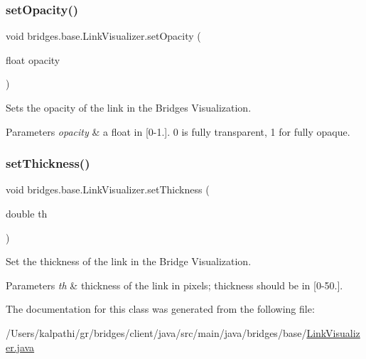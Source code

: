 \subsubsection{\texorpdfstring{set\+Opacity()}{setOpacity()}}
{\footnotesize\ttfamily void bridges.\+base.\+Link\+Visualizer.\+set\+Opacity (\begin{DoxyParamCaption}\item[{float}]{opacity }\end{DoxyParamCaption})}



Sets the opacity of the link in the Bridges Visualization. 


\begin{DoxyParams}{Parameters}
{\em opacity} & a float in \mbox{[}0-\/1.\mbox{]}. 0 is fully transparent, 1 for fully opaque. \\
\hline
\end{DoxyParams}
\mbox{\label{classbridges_1_1base_1_1_link_visualizer_a702e9ca345d1a4a035baf2041f275849}} 
\subsubsection{\texorpdfstring{set\+Thickness()}{setThickness()}}
{\footnotesize\ttfamily void bridges.\+base.\+Link\+Visualizer.\+set\+Thickness (\begin{DoxyParamCaption}\item[{double}]{th }\end{DoxyParamCaption})}



Set the thickness of the link in the Bridge Visualization. 


\begin{DoxyParams}{Parameters}
{\em th} & thickness of the link in pixels; thickness should be in \mbox{[}0-\/50.\mbox{]}. \\
\hline
\end{DoxyParams}


The documentation for this class was generated from the following file\+:\begin{DoxyCompactItemize}
\item 
/\+Users/kalpathi/gr/bridges/client/java/src/main/java/bridges/base/\mbox{\hyperlink{_link_visualizer_8java}{Link\+Visualizer.\+java}}\end{DoxyCompactItemize}
